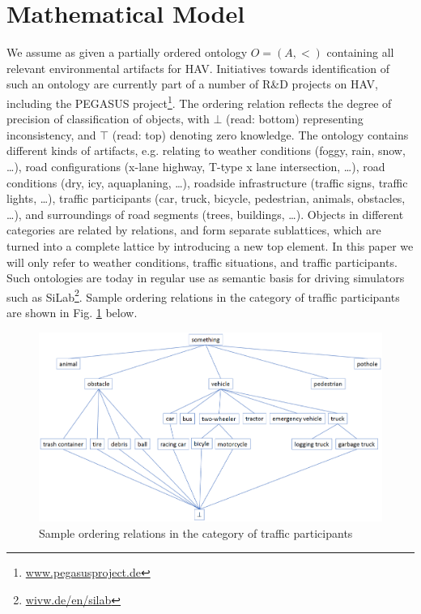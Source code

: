 \section{Mathematical Model}\label{sec:mathmodel}
We assume as given a partially ordered ontology $O = (A, <)$ containing all relevant environmental artifacts for HAV. Initiatives towards identification of such an ontology are currently part of a number of R\&D projects on HAV, including the PEGASUS project\footnote{\url{www.pegasusproject.de}}. The ordering relation reflects the degree of precision of classification of objects, with $\bot$ (read: bottom) representing inconsistency, and $\top$ (read: top) denoting zero knowledge. The ontology contains different kinds of artifacts, e.g. relating to weather conditions (foggy, rain, snow, \ldots), road configurations (x-lane highway, T-type x lane intersection, \ldots), road conditions (dry, icy, aquaplaning, \ldots), roadside infrastructure (traffic signs, traffic lights, \ldots), traffic participants (car, truck, bicycle, pedestrian, animals, obstacles, \ldots), and surroundings of road segments (trees, buildings, \ldots). Objects in different categories are related by relations, and form separate sublattices, which are turned into a complete lattice by introducing a new top element. In this paper we will only refer to weather conditions, traffic situations, and traffic participants. Such ontologies are today in regular use as semantic basis for driving simulators such as SiLab\footnote{\url{wivw.de/en/silab}}. Sample ordering relations in the category of traffic participants are shown in Fig. \ref{fig1} below.
\begin{figure}
\includegraphics[width=\textwidth]{fig1.eps}
\caption{Sample ordering relations in the category of traffic participants} \label{fig1}
\end{figure}

